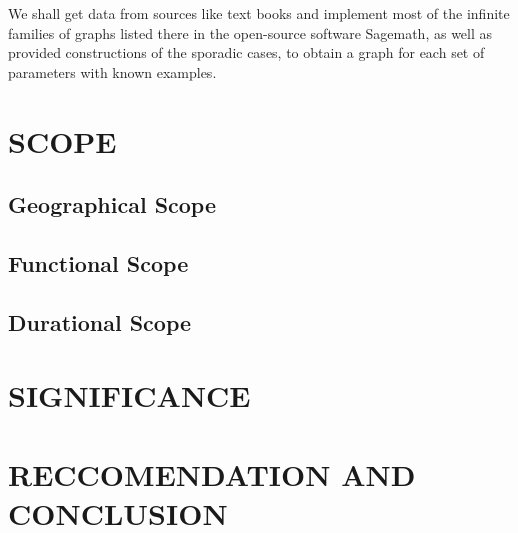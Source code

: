 \documentclass[11pt]{report}
\begin{document}
We shall get data from sources like text books and implement most of the infinite families of graphs listed there in the open-source software Sagemath, as well as provided constructions of the sporadic cases, to obtain a graph for each set of parameters with known examples.
\section{SCOPE}
\subsection{Geographical Scope}


\subsection{Functional Scope}


\subsection{Durational Scope}


\section{SIGNIFICANCE}


\section{RECCOMENDATION AND CONCLUSION}
\end{document}
